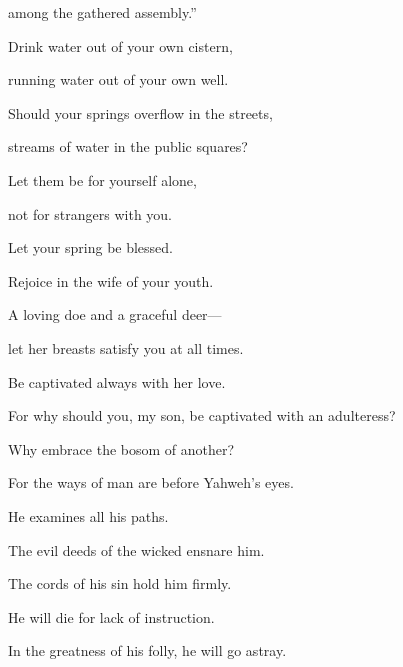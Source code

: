 {\par }{\QB among the gathered assembly.”
\par }{\BB \par }{\Q {}Drink water out of your own cistern,
\par }{\QB running water out of your own well.
\par }{\Q {}Should your springs overflow in the streets,
\par }{\QB streams of water in the public squares?
\par }{\Q {}Let them be for yourself alone,
\par }{\QB not for strangers with you.
\par }{\Q {}Let your spring be blessed.
\par }{\QB Rejoice in the wife of your youth.
\par }{\Q {}A loving doe and a graceful deer—
\par }{\QB let her breasts satisfy you at all times.
\par }{\QB Be captivated always with her love.
\par }{\Q {}For why should you, my son, be captivated with an adulteress?
\par }{\QB Why embrace the bosom of another?
\par }{\Q {}For the ways of man are before Yahweh’s eyes.
\par }{\QB He examines all his paths.
\par }{\Q {}The evil deeds of the wicked ensnare him.
\par }{\QB The cords of his sin hold him firmly.
\par }{\Q {}He will die for lack of instruction.
\par }{\QB In the greatness of his folly, he will go astray.

}
